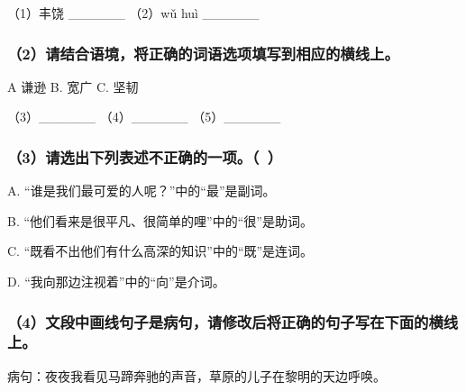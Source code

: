 （1）丰饶 \_\_\_\_\_\_ （2）wǔ huì \_\_\_\_\_\_



\subsubsection*{（2）请结合语境，将正确的词语选项填写到相应的横线上。}

A 谦逊 \quad B. 宽广 \quad C. 坚韧

（3）\_\_\_\_\_\_ （4）\_\_\_\_\_\_ （5）\_\_\_\_\_\_



\subsubsection*{（3）请选出下列表述不正确的一项。（\ ）}

A. “谁是我们最可爱的人呢？”中的“最”是副词。

B. “他们看来是很平凡、很简单的哩”中的“很”是助词。

C. “既看不出他们有什么高深的知识”中的“既”是连词。

D. “我向那边注视着”中的“向”是介词。



\subsubsection*{（4）文段中画线句子是病句，请修改后将正确的句子写在下面的横线上。}

病句：夜夜我看见马蹄奔驰的声音，草原的儿子在黎明的天边呼唤。

